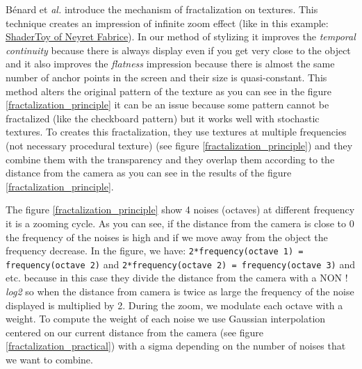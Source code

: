 Bénard et \textit{al.}\cite{benard_dynamic_2010} introduce the mechanism of fractalization on textures. This technique creates an impression of infinite zoom effect (like in this example: \href{https://www.shadertoy.com/view/XlBXWw?fbclid=IwAR1fU2JxQzXtks1ZcmVmzrHiv646G8w2gWceeiV-UToeFkAFMQ2NecbsGGs}{ShaderToy of Neyret Fabrice}). In our method of stylizing it improves the \textit{temporal continuity} because there is always display even if you get very close to the object and it also improves the \textit{flatness} impression because there is almost the same number of anchor points in the screen and their size is quasi-constant. This method alters the original pattern of the texture as you can see in the figure \ref{fractalization_principle} it can be an issue because some pattern cannot be fractalized (like the checkboard pattern) but it works well with stochastic textures. To creates this fractalization, they use textures at multiple frequencies (not necessary procedural texture) (see figure \ref{fractalization_principle}) and they combine them with the transparency and they overlap them according to the distance from the camera as you can see in the results of the figure \ref{fractalization_principle}. \newline


The figure \ref{fractalization_principle} show 4 noises (octaves) at different frequency it is a zooming cycle. As you can see, if the distance from the camera is close to 0 the frequency of the noises is high and if we move away from the object the frequency decrease. In the figure, we have: \texttt{2*frequency(octave 1) = frequency(octave 2)} and \texttt{2*frequency(octave 2) = frequency(octave 3)} and etc.  because in this case they divide the distance from the camera with a NON ! \textit{log2} so when the distance from camera is twice as large the frequency of the noise displayed is multiplied by 2. During the zoom, we modulate each octave with a weight. To compute the weight of each noise we use Gaussian interpolation centered on our current distance from the camera (see figure \ref{fractalization_practical}) with a sigma depending on the number of noises that we want to combine.








